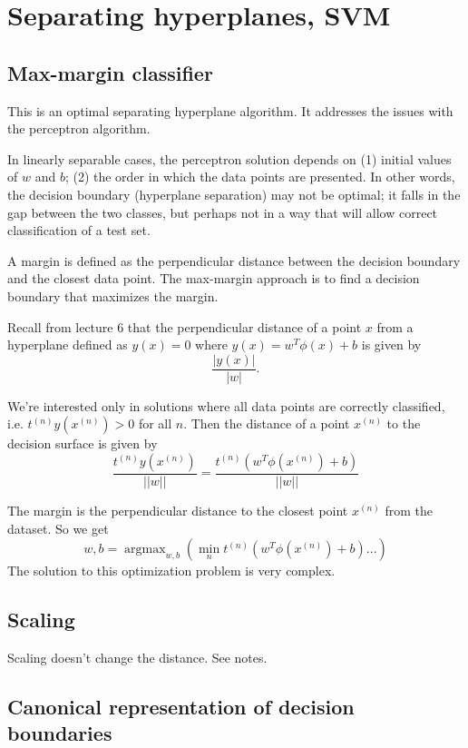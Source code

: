 \documentclass[a4paper,12pt]{article}
\DeclareMathOperator*{\argmax}{argmax}
\begin{document}
\section{Separating hyperplanes, SVM}

\subsection{Max-margin classifier}

This is an optimal separating hyperplane algorithm. It addresses the issues with the perceptron algorithm. 

In linearly separable cases, the perceptron solution depends on (1) initial values of $w$ and $b$; (2) the order in which the data points are presented. In other words, the decision boundary (hyperplane separation) may not be optimal; it falls in the gap between the two classes, but perhaps not in a way that will allow correct classification of a test set. 

A margin is defined as the perpendicular distance between the decision boundary and the closest data point. The max-margin approach is to find a decision boundary that maximizes the margin. 

Recall from lecture 6 that the perpendicular distance of a point $x$ from a hyperplane defined as $y(x) = 0$ where $y(x) = w^T\phi(x) + b$ is given by 
$$\frac{|y(x)|}{|w|}.$$

We're interested only in solutions where all data points are correctly classified, i.e. $t^{(n)}y(x^{(n)}) > 0$ for all $n$. Then the distance of a point $x^{(n)}$ to the decision surface is given by 
$$\frac{t^{(n)}y(x^{(n)})}{||w||} = \frac{t^{(n)}(w^T\phi(x^{(n)}) + b)}{||w||} $$

The margin is the perpendicular distance to the closest point $x^{(n)}$ from the dataset. So we get 
$$w, b = \argmax_{w,b} \left( \min_n t^{(n)}(w^T\phi(x^{(n)}) + b)... \right)$$
The solution to this optimization problem is very complex. 

\subsection{Scaling}

Scaling doesn't change the distance. See notes. 

\subsection{Canonical representation of decision boundaries}
\end{document}
